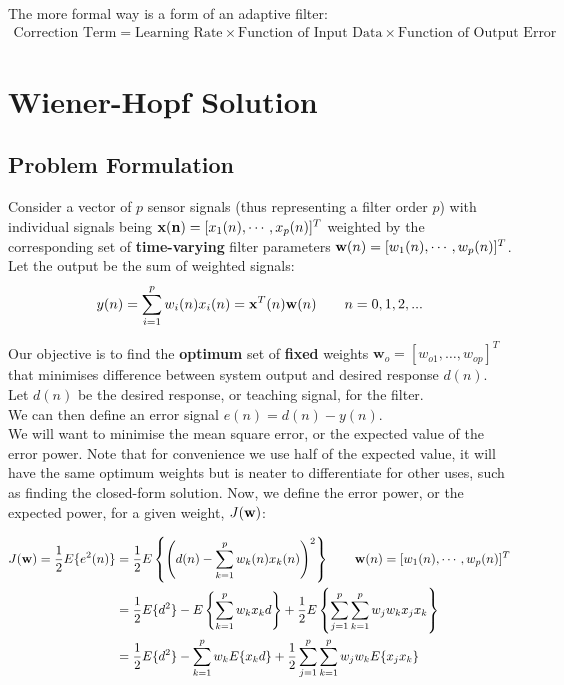 The more formal way is a form of an adaptive filter:
\begin{align}
    \text{Correction Term} = \text{Learning Rate} \times \text{Function of Input Data} \times \text{Function of Output Error}
\end{align}





\section{Wiener-Hopf Solution}
\subsection{Problem Formulation}
Consider a vector of $p$ sensor signals (thus representing a filter order $p$) with individual signals being $\mathbf{x(n)}= [x_1(n),\cdots,x_p(n)]^T $ weighted by the corresponding set of \textbf{time-varying} filter parameters $\mathbf{w}(n) = [w_1(n), \cdots, w_p(n)]^T$.\\

Let the output be the sum of weighted signals:
\begin{align}
    y(n) = \sum^p_{i=1} w_i(n)x_i(n) = \mathbf{x}^T(n)\mathbf{w}(n) \quad \quad n=0,1,2,...
\end{align}

Our objective is to find the \textbf{optimum} set of \textbf{fixed} weights $\mathbf{w}_o=[w_{o1},\ldots,w_{op}]^T$ that minimises difference between system output and desired response $d(n)$. Let $d(n)$ be the desired response, or teaching signal, for the filter. \\

We can then define an error signal $e(n) = d(n) - y(n)$.\\

We will want to minimise the mean square error, or the expected value of the error power. Note that for convenience we use half of the expected value, it will have the same optimum weights but is neater to differentiate for other uses, such as finding the closed-form solution. Now, we define the error power, or the expected power, for a given weight, $J(\mathbf{w})$:

\begin{align}
    J(\mathbf{w})=\frac12E\{e^2(n)\}&=\frac12E\left\{\left(d(n)-\sum_{k=1}^pw_k(n)x_k(n)\right)^2\right\} \quad \quad \mathbf{w}(n) = [w_1(n), \cdots, w_p(n)]^T\\
    &=\frac12E\{d^2\}-E\left\{\sum_{k=1}^pw_kx_kd\right\}+\frac12E\left\{\sum_{j=1}^p\sum_{k=1}^pw_jw_kx_jx_k\right\}\\
    &=\frac12E\{d^2\}-\sum_{k=1}^pw_kE\{x_kd\}+\frac12\sum_{j=1}^p\sum_{k=1}^pw_jw_kE\{x_jx_k\} \label{eqn:wiener}
\end{align}

